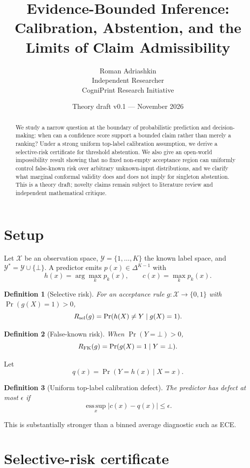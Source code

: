 \documentclass[11pt]{article}
\title{Evidence-Bounded Inference:\\
Calibration, Abstention, and the Limits of Claim Admissibility}
\author{Roman Adriashkin\\Independent Researcher\\CogniPrint Research Initiative}
\date{Theory draft v0.1 --- November 2026}
\newtheorem{definition}{Definition}
\begin{document}
\maketitle

\begin{abstract}
We study a narrow question at the boundary of probabilistic prediction and
decision-making: when can a confidence score support a bounded claim rather
than merely a ranking? Under a strong uniform top-label calibration assumption,
we derive a selective-risk certificate for threshold abstention. We also give
an open-world impossibility result showing that no fixed non-empty acceptance
region can uniformly control false-known risk over arbitrary unknown-input
distributions, and we clarify what marginal conformal validity does and does
not imply for singleton abstention. This is a theory draft; novelty claims
remain subject to literature review and independent mathematical critique.
\end{abstract}

\section{Setup}

Let $\mathcal X$ be an observation space,
$\mathcal Y=\{1,\dots,K\}$ the known label space, and
$\mathcal Y^*=\mathcal Y\cup\{\bot\}$.
A predictor emits $p(x)\in\Delta^{K-1}$ with
\[
h(x)=\arg\max_k p_k(x),\qquad c(x)=\max_k p_k(x).
\]

\begin{definition}[Selective risk]
For an acceptance rule $g:\mathcal X\to\{0,1\}$ with
$\Pr(g(X)=1)>0$,
\[
R_{\rm sel}(g)=\Pr(h(X)\neq Y\mid g(X)=1).
\]
\end{definition}

\begin{definition}[False-known risk]
When $\Pr(Y=\bot)>0$,
\[
R_{\rm FK}(g)=\Pr(g(X)=1\mid Y=\bot).
\]
\end{definition}

Let
\[
q(x)=\Pr(Y=h(x)\mid X=x).
\]

\begin{definition}[Uniform top-label calibration defect]
The predictor has defect at most $\epsilon$ if
\[
\operatorname*{ess\,sup}_{x}|c(x)-q(x)|\le\epsilon.
\]
\end{definition}

This is substantially stronger than a binned average diagnostic such as ECE.

\section{Selective-risk certificate}
\end{document}
